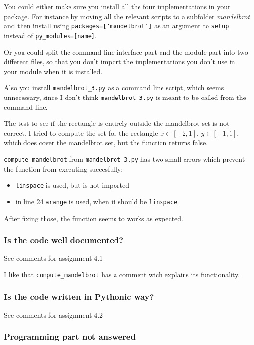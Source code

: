 \documentclass[a4paper]{article}
\begin{document}
You could either make sure you install all the four implementations in your package. For instance by moving all the relevant scripts to a subfolder \emph{mandelbrot} and then install using \texttt{packages=['mandelbrot']} as an argument to \texttt{setup} instead of \texttt{py\_modules=[name]}.

Or you could split the command line interface part and the module part into two different files, so that you don't import the implementations you don't use in your module when it is installed.

Also you install \texttt{mandelbrot\_3.py} as a command line script, which seems unnecessary, since I don't think \texttt{mandelbrot\_3.py} is meant to be called from the command line.

The test to see if the rectangle is entirely outside the mandelbrot set is not correct. I tried to compute the set for the rectangle $x \in [-2, 1]$, $y \in [-1, 1]$, which does cover the mandelbrot set, but the function returns false.



\texttt{compute\_mandelbrot} from \texttt{mandelbrot\_3.py} has two small errors which prevent the function from executing succesfully:

\begin{itemize}
    \item \texttt{linspace} is used, but is not imported

    \item in line 24 \texttt{arange} is used, when it should be \texttt{linspace}
\end{itemize}

After fixing those, the function seems to works as expected.


\subsubsection*{Is the code well documented?}
See comments for assignment 4.1

I like that \texttt{compute\_mandelbrot} has a comment wich explains its functionality.


\subsubsection*{Is the code written in Pythonic way?}
See comments for assignment 4.2


\subsubsection*{Programming part not answered}
\end{document}

